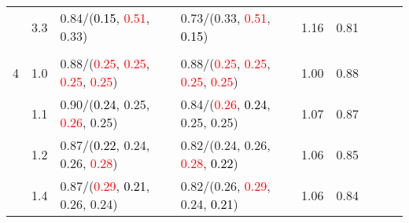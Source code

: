 \documentclass[10pt,a4paper]{report}
\begin{document}
\begin{table}[!htbp]
\begin{center}
{\begin{tabular}{ccllccccc}
				  & 3.3                               & 0.84/(\textcolor{black}{0.15}, \textcolor{red}{0.51}, 0.33)                                                                                                                                   & 0.73/(0.33, \textcolor{red}{0.51}, \textcolor{black}{0.15})                                                                                                                                   & 1.16             & 0.81                     \\
				  &                                   &                                                                                                                                                                                               &                                                                                                                                                                                               &                                             \\
				4 & 1.0                               & 0.88/(\textcolor{red}{0.25}, \textcolor{red}{0.25}, \textcolor{red}{0.25}, \textcolor{red}{0.25})                                                                                             & 0.88/(\textcolor{red}{0.25}, \textcolor{red}{0.25}, \textcolor{red}{0.25}, \textcolor{red}{0.25})                                                                                             & 1.00             & 0.88                     \\
				  & 1.1                               & 0.90/(\textcolor{black}{0.24}, 0.25, \textcolor{red}{0.26}, 0.25)                                                                                                                             & 0.84/(\textcolor{red}{0.26}, \textcolor{black}{0.24}, 0.25, 0.25)                                                                                                                             & 1.07             & 0.87                     \\
				  & 1.2                               & 0.87/(\textcolor{black}{0.22}, 0.24, 0.26, \textcolor{red}{0.28})                                                                                                                             & 0.82/(0.24, 0.26, \textcolor{red}{0.28}, \textcolor{black}{0.22})                                                                                                                             & 1.06             & 0.85                     \\
				  & 1.4                               & 0.87/(\textcolor{red}{0.29}, \textcolor{black}{0.21}, 0.26, 0.24)                                                                                                                             & 0.82/(0.26, \textcolor{red}{0.29}, 0.24, \textcolor{black}{0.21})                                                                                                                             & 1.06             & 0.84                     \\

\end{tabular}}
\end{center}
\end{table}
\end{document}
